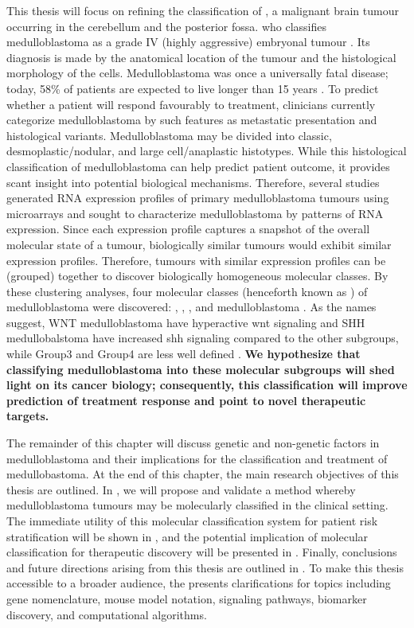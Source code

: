 This thesis will focus on refining the classification of , a malignant brain tumour occurring in the cerebellum and the posterior fossa. \gls{who} classifies medulloblastoma as a grade IV (highly aggressive) embryonal tumour . Its diagnosis is made by the anatomical location of the tumour and the histological morphology of the cells. Medulloblastoma was once a universally fatal disease; today, 58\% of patients are expected to live longer than 15 years . To predict whether a patient will respond favourably to treatment, clinicians currently categorize medulloblastoma by such features as metastatic presentation and histological variants. Medulloblastoma may be divided into classic, desmoplastic/nodular, and large cell/anaplastic histotypes. While this histological classification of medulloblastoma can help predict patient outcome, it provides scant insight into potential biological mechanisms. Therefore, several studies generated RNA expression profiles of primary medulloblastoma tumours using microarrays and sought to characterize medulloblastoma by patterns of RNA expression. Since each expression profile captures a snapshot of the overall molecular state of a tumour, biologically similar tumours would exhibit similar expression profiles. Therefore, tumours with similar expression profiles can be  (grouped) together to discover biologically homogeneous molecular classes. By these clustering analyses, four molecular classes (henceforth known as ) of medulloblastoma were discovered: , , , and  medulloblastoma . As the names suggest, WNT medulloblastoma have hyperactive \gls{wnt} signaling and SHH medullobalstoma have increased \gls{shh} signaling compared to the other subgroups, while Group3 and Group4 are less well defined . \textbf{We hypothesize that classifying medulloblastoma into these molecular subgroups will shed light on its cancer biology; consequently, this classification will improve prediction of treatment response and point to novel therapeutic targets.}

The remainder of this chapter will discuss genetic and non-genetic factors in medulloblastoma and their implications for the classification and treatment of medullobastoma. At the end of this chapter, the main research objectives of this thesis are outlined. In , we will propose and validate a method whereby medulloblastoma tumours may be molecularly classified in the clinical setting. The immediate utility of this molecular classification system for patient risk stratification will be shown in , and the potential implication of molecular classification for therapeutic discovery will be presented in . Finally, conclusions and future directions arising from this thesis are outlined in . To make this thesis accessible to a broader audience, the  presents clarifications for topics including gene nomenclature, mouse model notation, signaling pathways, biomarker discovery, and computational algorithms.


